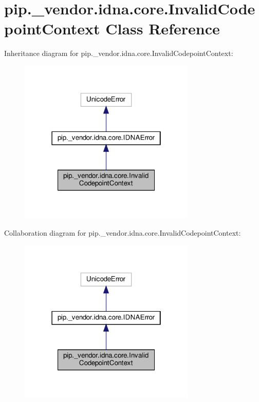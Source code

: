 \hypertarget{classpip_1_1__vendor_1_1idna_1_1core_1_1InvalidCodepointContext}{}\section{pip.\+\_\+vendor.\+idna.\+core.\+Invalid\+Codepoint\+Context Class Reference}
\label{classpip_1_1__vendor_1_1idna_1_1core_1_1InvalidCodepointContext}


Inheritance diagram for pip.\+\_\+vendor.\+idna.\+core.\+Invalid\+Codepoint\+Context\+:
\nopagebreak
\begin{figure}[H]
\begin{center}
\leavevmode
\includegraphics[width=238pt]{classpip_1_1__vendor_1_1idna_1_1core_1_1InvalidCodepointContext__inherit__graph}
\end{center}
\end{figure}


Collaboration diagram for pip.\+\_\+vendor.\+idna.\+core.\+Invalid\+Codepoint\+Context\+:
\nopagebreak
\begin{figure}[H]
\begin{center}
\leavevmode
\includegraphics[width=238pt]{classpip_1_1__vendor_1_1idna_1_1core_1_1InvalidCodepointContext__coll__graph}
\end{center}
\end{figure}



